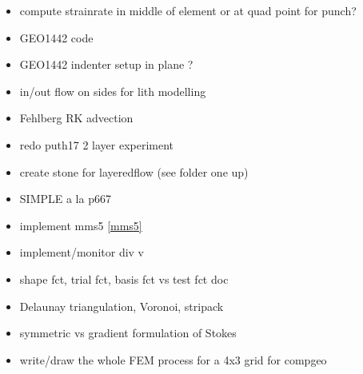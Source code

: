 \begin{itemize}
\item compute strainrate in middle of element or at quad point for punch?
\item GEO1442 code 
\item GEO1442 indenter setup in plane ?
\item in/out flow on sides for lith modelling
\item Fehlberg RK advection
\item redo puth17 2 layer experiment
\item create stone for layeredflow (see folder one up)
\item SIMPLE a la p667 \cite{john16} 
\item implement mms5 \ref{mms5}
\item implement/monitor div v
\item shape fct, trial fct, basis fct vs test fct doc
\item Delaunay triangulation, Voronoi, stripack
\item symmetric vs gradient formulation of Stokes
\item write/draw the whole FEM process for a 4x3 grid for compgeo
\end{itemize}
